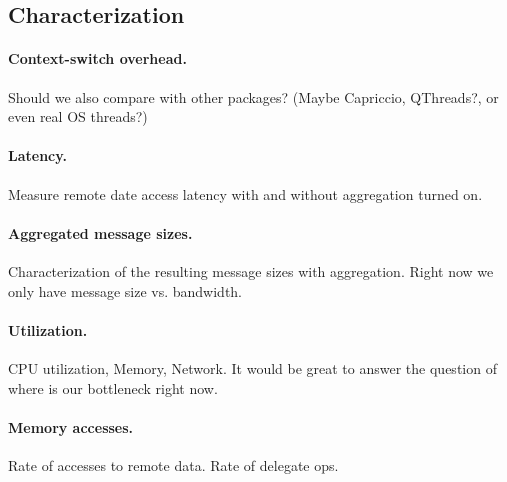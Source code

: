 \subsection{Characterization}

\paragraph{Context-switch overhead.} Should we also compare with other packages? (Maybe Capriccio, QThreads?, or even real OS threads?)

\paragraph{Latency.} Measure remote date access latency with and without aggregation turned on.

\paragraph{Aggregated message sizes.} Characterization of the resulting message sizes with aggregation. Right now we only have message size vs. bandwidth.

\paragraph{Utilization.} CPU utilization, Memory, Network. It would be great to answer the question of where is our bottleneck right now.

\paragraph{Memory accesses.} Rate of accesses to remote data. Rate of delegate ops.






